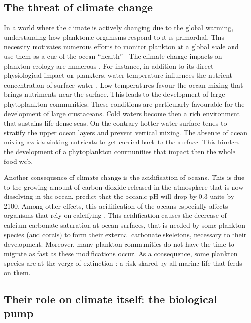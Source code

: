\subsection{The threat of climate change}

In a world where the climate is actively changing due to the global warming, understanding how planktonic organisms respond to it is primordial.
This necessity motivates numerous efforts to monitor plankton at a global scale \citep{brander2003use, batten2019global} and use them as a cue of the ocean ``health'' \citep{suthers2019importance}.
The climate change impacts on plankton ecology are numerous \citep{mckinnon2007vulnerability, hays2005climate}.
For instance, in addition to its direct physiological impact on plankters, water temperature influences the nutrient concentration of surface water \citep{bouman2003temperature, richardson2008hot, doney2006plankton}.
Low temperatures favour the ocean mixing that brings nutriments near the surface.
This leads to the development of large phytoplankton communities.
These conditions are particularly favourable for the development of large crustaceans.
Cold waters become then a rich environment that sustains life-dense seas.
On the contrary hotter water surface tends to stratify the upper ocean layers and prevent vertical mixing.
The absence of ocean mixing avoids sinking nutrients to get carried back to the surface.
This hinders the development of a phytoplankton communities that impact then the whole food-web.

Another consequence of climate change is the acidification of oceans. 
This is due to the growing amount of carbon dioxide released in the atmosphere that is now dissolving in the ocean.
\citet{caldeira2003anthropogenic} predict that the oceanic pH will drop by 0.3 units by 2100.
Among other effects, this acidification of the oceans especially affects organisms that rely on calcifying \citep{orr2005anthropogenic, flynn2012changes}.
This acidification causes the decrease of calcium carbonate saturation at ocean surfaces, that is needed by some plankton species (and corals) to form their external carbonate skeletons, necessary to their development.
Moreover, many plankton communities do not have the time to migrate as fast as these modifications occur.
As a consequence, some plankton species are at the verge of extinction \citep{trubovitz2020marine, lowery2020ecological}: a risk shared by all marine life that feeds on them.

\subsection{Their role on climate itself: the biological pump}

